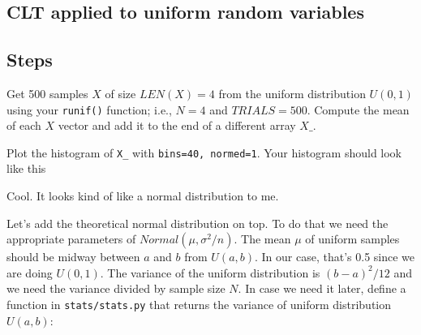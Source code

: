 \begin{fullwidth}
\section{CLT applied to uniform random variables}

\subsection{Steps}

\step Get 500 samples $X$ of size $LEN(X)=4$ from the uniform distribution $U(0,1)$ using your {\tt runif()} function; i.e., $N=4$ and $TRIALS=500$.  Compute the mean of each $X$ vector and add it to the end of a different array $X\_$.

\step Plot the histogram of {\tt X\_} with {\tt bins=40, normed=1}.  Your histogram should look like this \\

    
Cool.  It looks kind of like a normal distribution to me. 

\step Let's add the theoretical normal distribution on top. To do that we need the appropriate parameters of $Normal(\mu, \sigma^2/n)$. The mean  $\mu$ of uniform samples should be midway between $a$ and $b$ from $U(a,b)$. In our case, that's 0.5 since we are doing $U(0,1)$. The variance of the uniform distribution is $(b-a)^2/12$ and we need the variance divided by sample size $N$.   In case we need it later, define a function in {\tt stats/stats.py} that returns the variance of uniform distribution $U(a,b)$:


\end{fullwidth}
